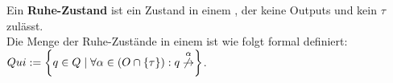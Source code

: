 \begin{frame}
  \begin{Def}[Ruhe]
    Ein \textbf{Ruhe-Zustand} ist ein Zustand in einem \EIO{}, der keine
    Outputs und kein $\tau$ zulässt.\\
    Die Menge der Ruhe-Zustände in einem \EIO{} ist wie folgt formal definiert:
    $Qui := \left\{q\in Q\mid\forall\alpha\in (O\cap\{\tau\}):
  q\overset{\alpha}{\not{\hspace{-0.1cm}\rightarrow}}\right\}$.
  \end{Def}
\end{frame}
